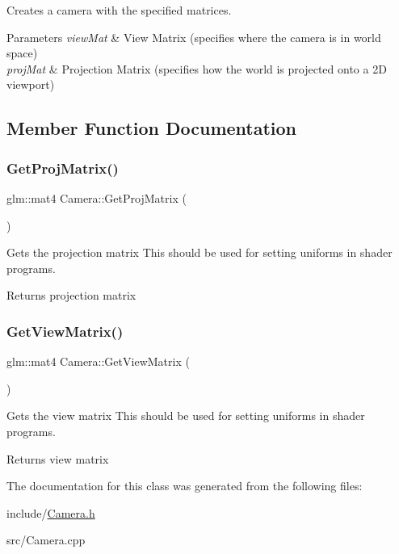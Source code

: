 Creates a camera with the specified matrices. 


\begin{DoxyParams}{Parameters}
{\em view\+Mat} & View Matrix (specifies where the camera is in world space) \\
\hline
{\em proj\+Mat} & Projection Matrix (specifies how the world is projected onto a 2D viewport) \\
\hline
\end{DoxyParams}


\subsection{Member Function Documentation}
\mbox{\label{class_camera_ad4af021f577c6326881c3596d76f99e9}} 
\subsubsection{\texorpdfstring{Get\+Proj\+Matrix()}{GetProjMatrix()}}
{\footnotesize\ttfamily glm\+::mat4 Camera\+::\+Get\+Proj\+Matrix (\begin{DoxyParamCaption}{ }\end{DoxyParamCaption})\hspace{0.3cm}{\ttfamily [inline]}}



Gets the projection matrix This should be used for setting uniforms in shader programs. 

\begin{DoxyReturn}{Returns}
projection matrix 
\end{DoxyReturn}
\mbox{\label{class_camera_affa333055635aed96518c4c66be9a70c}} 
\subsubsection{\texorpdfstring{Get\+View\+Matrix()}{GetViewMatrix()}}
{\footnotesize\ttfamily glm\+::mat4 Camera\+::\+Get\+View\+Matrix (\begin{DoxyParamCaption}{ }\end{DoxyParamCaption})\hspace{0.3cm}{\ttfamily [inline]}}



Gets the view matrix This should be used for setting uniforms in shader programs. 

\begin{DoxyReturn}{Returns}
view matrix 
\end{DoxyReturn}


The documentation for this class was generated from the following files\+:\begin{DoxyCompactItemize}
\item 
include/\hyperlink{_camera_8h}{Camera.\+h}\item 
src/Camera.\+cpp\end{DoxyCompactItemize}
